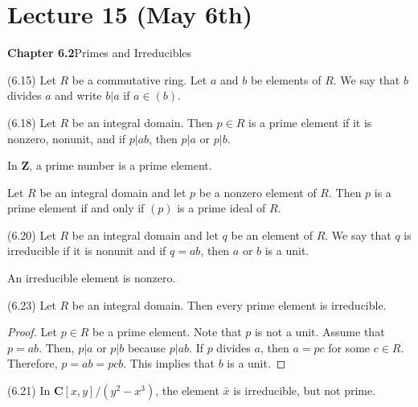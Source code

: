 \section{Lecture 15 (May 6th)}
{\bf Chapter 6.2}\hspace{2ex}Primes and Irreducibles
\\
\begin{defi}
(6.15) Let $R$ be a commutative ring. Let $a$ and $b$ be elements of $R$. We say that $b$ divides $a$ and write $b|a$ if $a\in (b)$.
\end{defi}
\vspace{2ex}
\begin{defi}
(6.18) Let $R$ be an integral domain. Then $p\in R$ is a prime element if it is nonzero, nonunit, and if $p|ab$, then $p|a$ or $p|b$. 
\end{defi}
\vspace{2ex}
\begin{ex}
In ${\bm Z}$, a prime number is a prime element. 
\end{ex}
\vspace{2ex}
\begin{lem}
Let $R$ be an integral domain and let $p$ be a nonzero element of $R$. Then $p$ is a prime element if and only if $(p)$ is a prime ideal of $R$. 
\end{lem}
\vspace{2ex}
\begin{defi}
(6.20) Let $R$ be an integral domain and let $q$ be an element of $R$. We say that $q$ is irreducible if it is nonunit and if $q=ab$, then $a$ or $b$ is a unit.
\end{defi}
\vspace{2ex}
\begin{rmk}
An irreducible element is nonzero. 
\end{rmk}
\vspace{2ex}
\begin{thm}
(6.23) Let $R$ be an integral domain. Then every prime element is irreducible. 
\end{thm}
\vspace{2ex}
\begin{proof}
Let $p\in R$ be a prime element. Note that $p$ is not a unit. Assume that $p=ab$. Then, $p|a$ or $p|b$ because $p|ab$. If $p$ divides $a$, then $a=pc$ for some $c\in R$. Therefore, $p=ab=pcb$. This implies that $b$ is a unit. 
\end{proof}
\vspace{2ex}
\begin{ex}
(6.21) In ${\bm C}[x,y]/(y^2-x^3)$, the element $\bar{x}$ is irreducible, but not prime. 
\end{ex}
